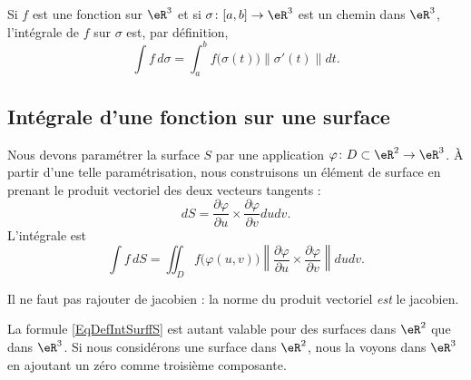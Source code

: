 Si $f$ est une fonction sur $\eR^3$ et si $\sigma\colon \mathopen[ a , b \mathclose]\to \eR^3$ est un chemin dans $\eR^3$, l'intégrale de $f$ sur $\sigma$ est, par définition,
\begin{equation}
    \int f\,d\sigma=\int_a^b f\big( \sigma(t) \big)\| \sigma'(t) \|dt.
\end{equation}

\subsection{Intégrale d'une fonction sur une surface}

Nous devons paramétrer la surface $S$ par une application $\varphi\colon D\subset\eR^2\to \eR^3$. À partir d'une telle paramétrisation, nous construisons un élément de surface en prenant le produit vectoriel des deux vecteurs tangents :
\begin{equation}
    dS=\frac{ \partial \varphi }{ \partial u }\times\frac{ \partial \varphi }{ \partial v }dudv.
\end{equation}
L'intégrale est
\begin{equation}        \label{EqDefIntSurffS}
    \int f\,dS=\iint_Df\big( \varphi(u,v) \big)\left\| \frac{ \partial \varphi }{ \partial u }\times\frac{ \partial \varphi }{ \partial v } \right\|dudv.
\end{equation}

Il ne faut pas rajouter de jacobien : la norme du produit vectoriel \emph{est} le jacobien.

\begin{remark}
    La formule \eqref{EqDefIntSurffS} est autant valable pour des surfaces dans $\eR^2$ que dans $\eR^3$. Si nous considérons une surface dans $\eR^2$, nous la voyons dans $\eR^3$ en ajoutant un zéro comme troisième composante.
\end{remark}

